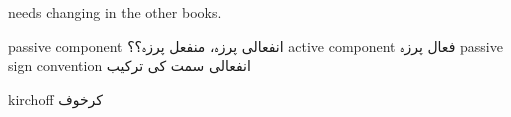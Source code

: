 needs changing in the other books.

passive component انفعالی پرزہ، منفعل پرزہ؟؟
active component فعال پرزہ
passive sign convention انفعالی سمت کی ترکیب

kirchoff  کرخوف

